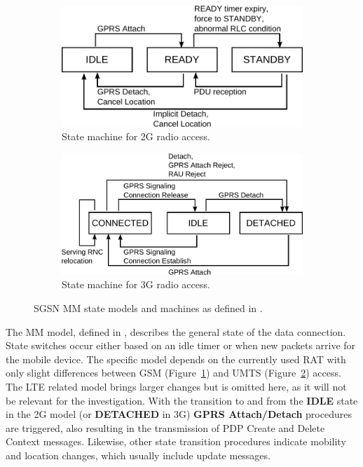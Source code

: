 \begin{figure}[htb]
	\centering
	\begin{subfigure}[b]{0.60\textwidth}
		\includegraphics[width=\textwidth]{images/mm-2g-state-model.pdf}
		\caption{State machine for \gls{2G} radio access.}
		\label{c4:fig:2g-mmstatemodel}
	\end{subfigure}%

	\begin{subfigure}[b]{0.70\textwidth}
		\includegraphics[width=\textwidth]{images/mm-3g-state-model.pdf}
		\caption{State machine for \gls{3G} radio access.}
		\label{c4:fig:3g-mmstatemodel}
	\end{subfigure}%
	\caption{\gls{SGSN} \gls{MM} state models and machines as defined in \cite[Section~6.1]{3gpp.23.060}.}
\label{c4:fig:mmstatemodel}
\end{figure}

The \gls{MM} model, defined in \cite[Section~6.1]{3gpp.23.060}, describes the general state of the data connection. State switches occur either based on an idle timer or when new packets arrive for the mobile device. The specific model depends on the currently used \gls{RAT} with only slight differences between \gls{GSM} (Figure~\ref{c4:fig:2g-mmstatemodel}) and \gls{UMTS} (Figure~\ref{c4:fig:3g-mmstatemodel}) access. The \gls{LTE} related model brings larger changes but is omitted here, as it will not be relevant for the investigation. With the transition to and from the \textbf{IDLE} state in the \gls{2G} model (or \textbf{DETACHED} in \gls{3G}) \textbf{GPRS Attach/Detach} procedures are triggered, also resulting in the transmission of \gls{PDP} Create and Delete Context messages. Likewise, other state transition procedures indicate mobility and location changes, which usually include update messages.

